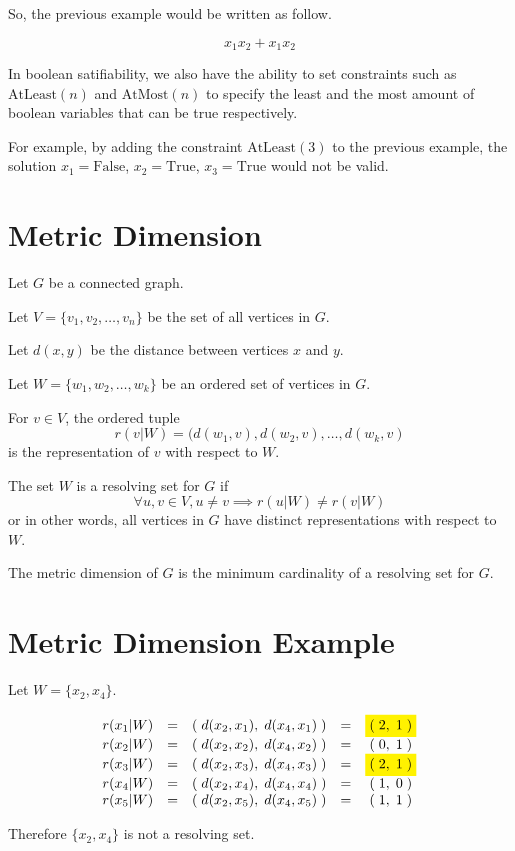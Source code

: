\documentclass[12pt]{article}
\def\hl{\colorbox{yellow}}
\def\True{\mathrm{True}}
\def\False{\mathrm{False}}
\begin{document}
So, the previous example would be written as follow.

\[ x_1 x_2 + x_1 x_2 \]

In boolean satifiability, we also have the ability to set constraints such as $\mathrm{AtLeast}(n)$ and $\mathrm{AtMost}(n)$ to specify the least and the most amount of boolean variables that can be true respectively.

For example, by adding the constraint $\mathrm{AtLeast}(3)$ to the previous example, the solution $x_1 = \False$, $x_2 = \True$, $x_3 = \True$ would not be valid.

\newpage
\section*{Metric Dimension}

Let $G$ be a connected graph.

Let $V = \{v_1, v_2, \ldots, v_n\}$ be the set of all vertices in $G$.

Let $d(x, y)$ be the distance between vertices $x$ and $y$.

Let $W = \{w_1, w_2, \ldots, w_k\}$ be an ordered set of vertices in $G$.

For $v \in V$, the ordered tuple
	$$r(v|W) = (d(w_1, v), d(w_2, v), \ldots, d(w_k, v)$$
is the representation of $v$ with respect to $W$.

The set $W$ is a resolving set for $G$ if
	$$\forall u, v \in V, u \neq v \implies r(u|W) \neq r(v|W)$$
or in other words, all vertices in $G$ have distinct representations with respect to $W$.

The metric dimension of $G$ is the minimum cardinality of a resolving set for $G$.

\newpage
\section*{Metric Dimension Example}
\begin{minipage}[t]{0.65\textwidth}
\setlength{\parskip}{\baselineskip}

Let $W = \{x_2, x_4\}$.

\[
\begin{array}{lclcc}
r(x_1|W) &=& (\;d(x_2, x_1),\; d(x_4, x_1)\;) &=& \hl{$(\;2,\; 1\;)$} \\
r(x_2|W) &=& (\;d(x_2, x_2),\; d(x_4, x_2)\;) &=&      (\;0,\; 1\;)   \\
r(x_3|W) &=& (\;d(x_2, x_3),\; d(x_4, x_3)\;) &=& \hl{$(\;2,\; 1\;)$} \\
r(x_4|W) &=& (\;d(x_2, x_4),\; d(x_4, x_4)\;) &=&      (\;1,\; 0\;)   \\
r(x_5|W) &=& (\;d(x_2, x_5),\; d(x_4, x_5)\;) &=&      (\;1,\; 1\;)
\end{array}
\]

Therefore $\{x_2, x_4\}$ is not a resolving set.

\end{minipage}
\hfill
\begin{minipage}[t]{0.3\textwidth}
	\begin{figure}[H]
		
	\end{figure}
\end{minipage}
\end{document}
